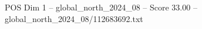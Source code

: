 \begin{textsample}{POS Dim 1 – global\_north\_2024\_08 – Score 33.00 – global\_north\_2024\_08/112683692.txt}
\end{textsample}
